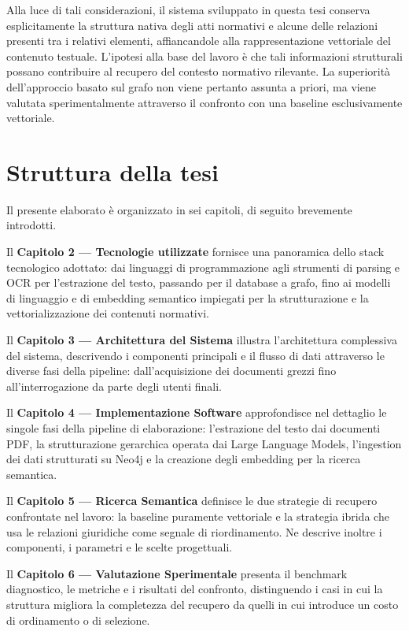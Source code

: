 Alla luce di tali considerazioni, il sistema sviluppato in questa tesi conserva esplicitamente la struttura nativa degli atti normativi e alcune delle relazioni presenti tra i relativi elementi, affiancandole alla rappresentazione vettoriale del contenuto testuale. L'ipotesi alla base del lavoro è che tali informazioni strutturali possano contribuire al recupero del contesto normativo rilevante. La superiorità dell'approccio basato sul grafo non viene pertanto assunta a priori, ma viene valutata sperimentalmente attraverso il confronto con una baseline esclusivamente vettoriale.

\section{Struttura della tesi}
Il presente elaborato è organizzato in sei capitoli, di seguito brevemente introdotti.

Il \textbf{Capitolo 2 — Tecnologie utilizzate} fornisce una panoramica dello stack tecnologico adottato: dai linguaggi di programmazione agli strumenti di parsing e OCR per l'estrazione del testo, passando per il database a grafo, fino ai modelli di linguaggio e di embedding semantico impiegati per la strutturazione e la vettorializzazione dei contenuti normativi.

Il \textbf{Capitolo 3 — Architettura del Sistema} illustra l'architettura complessiva del sistema, descrivendo i componenti principali e il flusso di dati attraverso le diverse fasi della pipeline: dall'acquisizione dei documenti grezzi fino all'interrogazione da parte degli utenti finali.

Il \textbf{Capitolo 4 — Implementazione Software} approfondisce nel dettaglio le singole fasi della pipeline di elaborazione: l'estrazione del testo dai documenti PDF, la strutturazione gerarchica operata dai Large Language Models, l'ingestion dei dati strutturati su Neo4j e la creazione degli embedding per la ricerca semantica.

Il \textbf{Capitolo 5 — Ricerca Semantica} definisce le due strategie di recupero confrontate nel lavoro: la baseline puramente vettoriale e la strategia ibrida che usa le relazioni giuridiche come segnale di riordinamento. Ne descrive inoltre i componenti, i parametri e le scelte progettuali.

Il \textbf{Capitolo 6 — Valutazione Sperimentale} presenta il benchmark diagnostico, le metriche e i risultati del confronto, distinguendo i casi in cui la struttura migliora la completezza del recupero da quelli in cui introduce un costo di ordinamento o di selezione.
